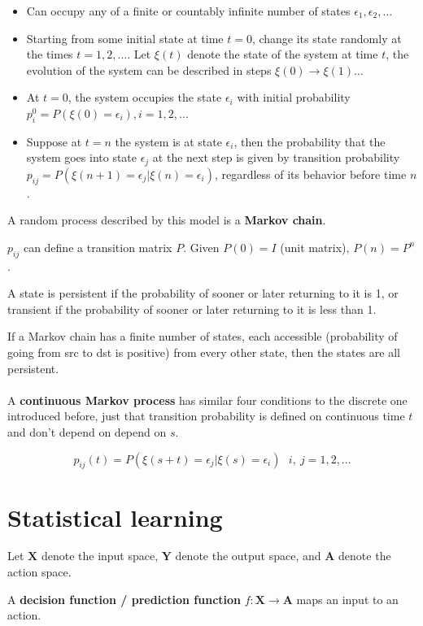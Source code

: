 \documentclass{article}
\begin{document}
\begin{itemize}
  \item Can occupy any of a finite or countably infinite number of states $\epsilon_1, \epsilon_2, \dots$
  \item Starting from some initial state at time $t = 0$, change its state randomly at the times $t = 1, 2, \dots$. Let $\xi(t)$ denote the state of the system at time $t$, the evolution of the system can be described in steps $\xi(0) \to \xi(1) \dots$
  \item At $t = 0$, the system occupies the state $\epsilon_i$ with initial probability $p^0_i = P(\xi(0) = \epsilon_i), i = 1, 2, \dots$
  \item Suppose at $t = n$ the system is at state $\epsilon_i$, then the probability that the system goes into state $\epsilon_j$ at the next step is given by transition probability $p_{ij} = P(\xi(n + 1) = \epsilon_j | \xi(n) = \epsilon_i)$, regardless of its behavior before time $n$.
\end{itemize}

A random process described by this model is a \textbf{Markov chain}.

$p_{ij}$ can define a transition matrix $P$.
Given $P(0) = I$ (unit matrix), $P(n) = P^n$.

A state is persistent if the probability of sooner or later returning to it is 1, or transient if the probability of sooner or later returning to it is less than 1.

If a Markov chain has a finite number of states, each accessible (probability of going from src to dst is positive) from every other state, then the states are all persistent.
\\
\\
A \textbf{continuous Markov process} has similar four conditions to the discrete one introduced before, just that transition probability is defined on continuous time $t$ and don't depend on depend on $s$.

$$
p_{ij}(t) = P(\xi(s + t) = \epsilon_j | \xi(s) = \epsilon_i) ~ ~ ~ i, ~j = 1, 2, \dots
$$

\section{Statistical learning}

Let $\mathbf{X}$ denote the input space, $\mathbf{Y}$ denote the output space, and $\mathbf{A}$ denote the action space.

A \textbf{decision function / prediction function} $f: \mathbf{X} \to \mathbf{A}$ maps an input to an action.
\end{document}
